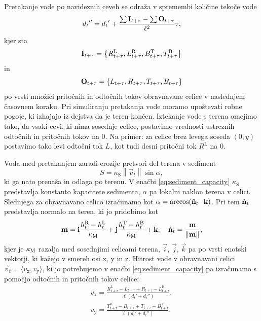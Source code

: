 \documentclass[9pt]{style/friteza}
\begin{document}
Pretakanje vode po navideznih ceveh se odraža v spremembi količine tekoče vode
\begin{equation}
{d_{t}}'' = {d_{t}}' + \frac{\sum \mathbf{I}_{t + \tau} - \sum \mathbf{O}_{t + \tau}}{\ell^2} \tau,
\end{equation}
kjer sta $$\mathbf{I}_{t + \tau} = \left\{R^\mathrm{L}_{t + \tau}, L^\mathrm{R}_{t + \tau}, B^\mathrm{T}_{t + \tau}, T^\mathrm{B}_{t + \tau}\right\}$$ in $$\mathbf{O}_{t + \tau} = \left\{L_{t + \tau}, R_{t + \tau}, T_{t + \tau}, B_{t + \tau}\right\}$$ po vrsti množici pritočnih in odtočnih tokov obravnavane celice v naslednjem časovnem koraku. Pri simuliranju pretakanja vode moramo upoštevati robne pogoje, ki izhajajo iz dejstva da je teren končen. Iztekanje vode s terena omejimo tako, da vsaki cevi, ki nima sosednje celice, postavimo vrednosti ustreznih odtočnih in pritočnih tokov na 0. Na primer: za celice brez levega soseda $(0,y)$ postavimo tako levi odtočni tok $L$, kot tudi desni pritočni tok $R^\mathrm{L}$ na 0.

Voda med pretakanjem zaradi erozije pretvori del terena v sediment
\begin{equation} \label{eq:sediment_capacity}
S = \kappa_\mathrm{S} \left\| \vec{v}_t \right\| \sin{\alpha},
\end{equation}
ki ga nato prenaša in odlaga po terenu. V enačbi \eqref{eq:sediment_capacity} $\kappa_\mathrm{S}$ predstavlja konstanto kapacitete sedimenta, $\alpha$ pa lokalni naklon terena v celici. Slednjega za obravnavano celico izračunamo kot $\alpha  = \arccos(\hat{\mathbf{n}}_t \cdot \mathbf{k})$. Pri tem $\hat{\mathbf{n}}_t$ predstavlja normalo na teren, ki jo pridobimo kot
\begin{equation}
\mathbf{m} = \mathbf{i}\frac{h^{\mathrm{R}}_t - h^{\mathrm{L}}_t}{{\kappa_\mathrm{M}}} + \mathbf{j}\frac{h^{\mathrm{T}}_t - h^{\mathrm{B}}_t}{{\kappa_\mathrm{M}}} + \mathbf{k},
\quad
\hat{\mathbf{n}}_t = \frac{\mathbf{m}}{\left\|\mathbf{m}\right\|},
\end{equation}
kjer je ${\kappa_\mathrm{M}}$ razalja med sosednjimi celicami terena, $\vec{i}$, $\vec{j}$, $\vec{k}$ pa po vrsti enotski vektorji, ki kažejo v smereh osi x, y in z. Hitrost vode v obravnavani celici $\vec{v}_t = \langle v_\mathrm{x}, v_\mathrm{y} \rangle$, ki jo potrebujemo v enačbi \eqref{eq:sediment_capacity} pa izračunamo s pomočjo odtočnih in pritočnih tokov celice:
\begin{eqnarray} \label{eq:velocity1}
v_\mathrm{x}=\frac{R^\mathrm{L}_{t+\tau} - L_{t+\tau} + R_{t+\tau} - L^\mathrm{R}_{t+\tau}}{\ell ({d_t}' + {d_t}'')}, \\
v_\mathrm{y}=\frac{T^{\mathrm{B}}_{t+\tau} - B_{t+\tau} + T_{t+\tau} - B^{\mathrm{T}}_{t+\tau}}{\ell ({d_t}' + {d_t}'')}.
\end{eqnarray}
\end{document}
